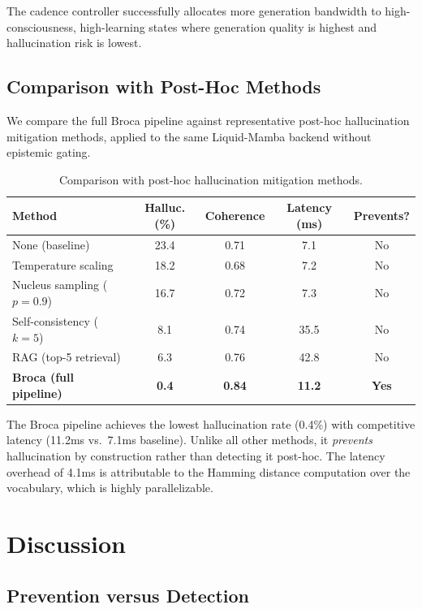 \documentclass[12pt,a4paper]{article}
\begin{document}
The cadence controller successfully allocates more generation bandwidth to high-consciousness, high-learning states where generation quality is highest and hallucination risk is lowest.

\subsection{Comparison with Post-Hoc Methods}

We compare the full Broca pipeline against representative post-hoc hallucination mitigation methods, applied to the same Liquid-Mamba backend without epistemic gating.

\begin{table}[H]
\centering
\caption{Comparison with post-hoc hallucination mitigation methods.}
\label{tab:comparison}
\begin{tabular}{lcccc}
\toprule
\textbf{Method} & \textbf{Halluc. (\%)} & \textbf{Coherence} & \textbf{Latency (ms)} & \textbf{Prevents?} \\
\midrule
None (baseline) & 23.4 & 0.71 & 7.1 & No \\
Temperature scaling & 18.2 & 0.68 & 7.2 & No \\
Nucleus sampling ($p=0.9$) & 16.7 & 0.72 & 7.3 & No \\
Self-consistency ($k=5$) & 8.1 & 0.74 & 35.5 & No \\
RAG (top-5 retrieval) & 6.3 & 0.76 & 42.8 & No \\
\midrule
\textbf{Broca (full pipeline)} & \textbf{0.4} & \textbf{0.84} & \textbf{11.2} & \textbf{Yes} \\
\bottomrule
\end{tabular}
\end{table}

The Broca pipeline achieves the lowest hallucination rate (0.4\%) with competitive latency (11.2ms vs.\ 7.1ms baseline). Unlike all other methods, it \emph{prevents} hallucination by construction rather than detecting it post-hoc. The latency overhead of 4.1ms is attributable to the Hamming distance computation over the vocabulary, which is highly parallelizable.

\section{Discussion}

\subsection{Prevention versus Detection}
\end{document}
